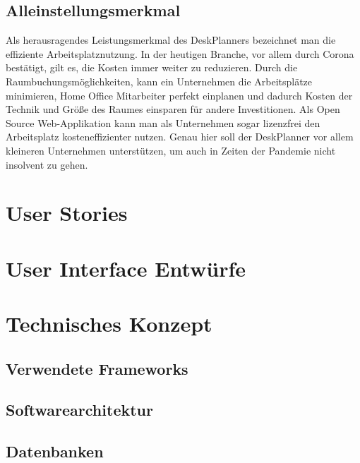 \documentclass{article}
\begin{document}
\subsection{Alleinstellungsmerkmal}
Als herausragendes Leistungsmerkmal des DeskPlanners bezeichnet man die 
effiziente Arbeitsplatznutzung. In der heutigen Branche, vor allem durch Corona 
bestätigt, gilt es, die Kosten immer weiter zu reduzieren. Durch die 
Raumbuchungsmöglichkeiten, kann ein Unternehmen die Arbeitsplätze minimieren, Home Office
Mitarbeiter perfekt einplanen und dadurch Kosten der Technik und Größe des Raumes
einsparen für andere Investitionen. Als Open Source Web-Applikation kann man
als Unternehmen sogar lizenzfrei den Arbeitsplatz kosteneffizienter nutzen.
Genau hier soll der DeskPlanner vor allem kleineren Unternehmen unterstützen, um 
auch in Zeiten der Pandemie nicht insolvent zu gehen.

\section{User Stories}

\section{User Interface Entwürfe}

\section{Technisches Konzept}

\subsection{Verwendete Frameworks}

\subsection{Softwarearchitektur}

\subsection{Datenbanken}

% 


\end{document}

